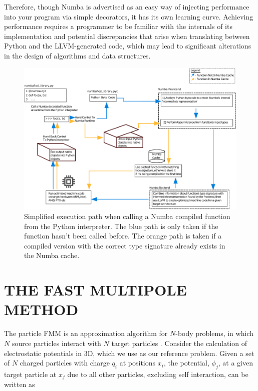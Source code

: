 \documentclass{IEEEcsmag}
\begin{document}
Therefore, though Numba is advertised as an easy way of injecting performance into your program via simple decorators, it has its own learning curve. Achieving performance requires a programmer to be familiar with the internals of its implementation and potential discrepancies that arise when translating between Python and the LLVM-generated code, which may lead to significant alterations in the design of algorithms and data structures.

\begin{figure}
    \centerline{\includegraphics {figures/numba.pdf}}
    \caption{Simplified execution path when calling a Numba compiled function from the Python interpreter. The blue path is only taken if the function hasn't been called before. The orange path is taken if a compiled version with the correct type signature already exists in the Numba cache.}
    \label{fig:numba}
\end{figure}



\section{THE FAST MULTIPOLE METHOD}

The particle FMM is an approximation algorithm for $N$-body problems, in which $N$ source particles interact with $N$ target particles \cite{Greengard1987}. Consider the calculation of electrostatic potentials in 3D, which we use as our reference problem. Given a set of $N$ charged particles with charge $q_i$ at positions $x_i$, the potential, $\phi_j$, at a given target particle at $x_j$ due to all other particles, excluding self interaction, can be written as
\end{document}
